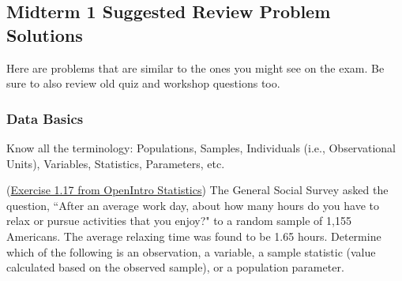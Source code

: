 \documentclass[12pt,answers]{exam}
\newcounter{countA}
\begin{document}
\subsection*{Midterm 1 Suggested Review Problem Solutions}  

Here are problems that are similar to the ones you might see on the
exam. Be sure to also review old quiz and workshop questions too.

\subsubsection*{Data Basics}

Know all the terminology: Populations, Samples, Individuals (i.e., Observational Units), Variables, Statistics, Parameters, etc.


\begin{questions}
\setcounter{question}{\value{countA}}
\question (\href{http://people.hsc.edu/faculty-staff/blins/books/OpenIntroStats4e.pdf\#eoce.1.17}{Exercise 1.17 from OpenIntro Statistics}) The General Social Survey asked the question, ``After an average work day,
about how many hours do you have to relax or pursue activities that you enjoy?" to a random sample of 1,155
Americans. The average relaxing time was found to be 1.65 hours. Determine which of the following is an
observation, a variable, a sample statistic (value calculated based on the observed sample), or a population
parameter.
\end{questions}
\end{document}
